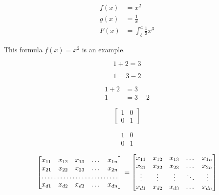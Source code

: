 \documentclass{article}
\begin{document}
\begin{align*}
  f(x) &= x^2\\
  g(x) &= \frac{1}{x}\\
  F(x) &= \int^a_b \frac{1}{3}x^3
\end{align*}

This formula $f(x) = x^2$ is an example.


\begin{equation*}
  1 + 2 = 3 
\end{equation*}

\begin{equation*}
  1 = 3 - 2
\end{equation*}


\begin{align*}
  1 + 2 &= 3\\
  1 &= 3 - 2
\end{align*}

\[
\begin{bmatrix}
	1 & 0\\
	0 & 1
\end{bmatrix}
\]


\[
\begin{matrix}
	1 & 0\\
	0 & 1
\end{matrix}
\]


\[
\begin{bmatrix}
    x_{11}       & x_{12} & x_{13} & \dots & x_{1n} \\
    x_{21}       & x_{22} & x_{23} & \dots & x_{2n} \\
    \hdotsfor{5} \\
    x_{d1}       & x_{d2} & x_{d3} & \dots & x_{dn}
\end{bmatrix}
=
\begin{bmatrix}
    x_{11} & x_{12} & x_{13} & \dots  & x_{1n} \\
    x_{21} & x_{22} & x_{23} & \dots  & x_{2n} \\
    \vdots & \vdots & \vdots & \ddots & \vdots \\
    x_{d1} & x_{d2} & x_{d3} & \dots  & x_{dn}
\end{bmatrix}
\]
\end{document}
